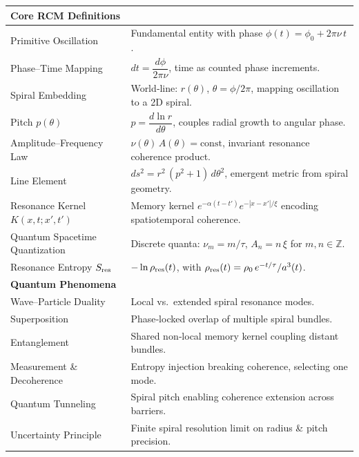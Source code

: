 \begin{table}[H]
  \centering
  \small
  \setlength{\tabcolsep}{4pt}
  \renewcommand{\arraystretch}{1.2}
  \begin{tabular}{p{} p{}}
    \toprule
    \multicolumn{2}{l}{\textbf{Core RCM Definitions}} \\[-3pt]
    \midrule
    Primitive Oscillation 
      & Fundamental entity with phase $\phi(t)=\phi_0+2\pi\nu\,t$. \\
    Phase–Time Mapping 
      & $dt=\dfrac{d\phi}{2\pi\nu}$, time as counted phase increments. \\
    Spiral Embedding 
      & World‐line: $r(\theta)$, $\theta=\phi/2\pi$, mapping oscillation to a 2D spiral. \\
    Pitch $p(\theta)$ 
      & $p=\dfrac{d\ln r}{d\theta}$, couples radial growth to angular phase. \\
    Amplitude–Frequency Law 
      & $\nu(\theta)\,A(\theta)=\text{const}$, invariant resonance coherence product. \\
    Line Element 
      & $ds^2 = r^2\,(p^2+1)\,d\theta^2$, emergent metric from spiral geometry. \\
    Resonance Kernel $K(x,t;x',t')$
      & Memory kernel $e^{-\alpha(t-t')}e^{-|x-x'|/\xi}$ encoding spatiotemporal coherence. \\
    Quantum Spacetime Quantization 
      & Discrete quanta: $\nu_m = m/\tau$, $A_n = n\,\xi$ for $m,n\in\mathbb{Z}$. \\
    Resonance Entropy $S_{\rm res}$
      & $-\ln\rho_{\rm res}(t)$, with $\rho_{\rm res}(t)=\rho_0\,e^{-t/\tau}/a^3(t)$. \\[4pt]
    \midrule
    \multicolumn{2}{l}{\textbf{Quantum Phenomena}} \\[-3pt]
    \midrule
    Wave–Particle Duality 
      & Local vs.\ extended spiral resonance modes. \\
    Superposition 
      & Phase‐locked overlap of multiple spiral bundles. \\
    Entanglement 
      & Shared non‐local memory kernel coupling distant bundles. \\
    Measurement \& Decoherence 
      & Entropy injection breaking coherence, selecting one mode. \\
    Quantum Tunneling 
      & Spiral pitch enabling coherence extension across barriers. \\
    Uncertainty Principle 
      & Finite spiral resolution limit on radius \& pitch precision. \\[4pt]

\end{tabular}
\end{table}
